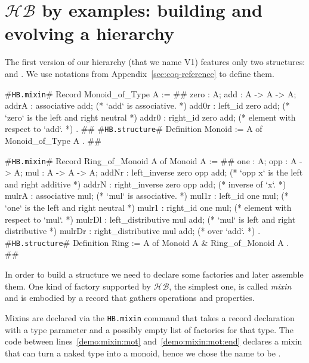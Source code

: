 \documentclass[a4paper,UKenglish,cleveref, autoref]{lipics-v2019}
\newcommand{\HB}{\ensuremath{\mathcal{HB}}}
\newcommand{\mixin}{mixin}
\newcommand{\mixins}{mixins}
\newcommand{\Mixins}{Mixins}
\newcommand{\factory}{factory}
\newcommand{\factories}{factories}
\newcommand{\hbmixin}{{\tt\color{dkgreen}HB.mixin}}
\newcommand{\hbstructure}{{\tt\color{dkgreen}HB.structure}}
\theoremstyle{implem}
\theoremstyle{implem}
\theoremstyle{command}
\theoremstyle{commands}
\begin{document}
\section{\HB{} by examples: building and evolving a hierarchy}
\label{sec:example}

The first version of our hierarchy (that we name V1) features only two
structures:  and . We use notations from Appendix~\ref{sec:coq-reference} to define them.
\begin{coqcode}
#\hbmixin{}# Record Monoid_of_Type A := {                       #\label{demo:mixin:mot}#
  zero : A;
  add : A -> A -> A;
  addrA : associative add;             (* `add` is associative.                   *)
  add0r : left_id zero add;            (* `zero` is the left and right neutral    *)
  addr0 : right_id zero add;           (*   element with respect to `add`.        *)
}.                                                             #\label{demo:mixin:mot:end}#
#\hbstructure{}# Definition Monoid := { A of Monoid_of_Type A }.        #\label{demo:structure:monoid}#

#\hbmixin{}# Record Ring_of_Monoid A of Monoid A := {       #\label{demo:mixin:rom}#
  one : A;
  opp : A -> A;
  mul : A -> A -> A;
  addNr : left_inverse zero opp add;   (* `opp x` is the left and right additive  *)
  addrN : right_inverse zero opp add;  (*   inverse of `x`.                       *)
  mulrA : associative mul;             (* `mul` is associative.                   *)
  mul1r : left_id one mul;             (* `one` is the left and right neutral     *)
  mulr1 : right_id one mul;            (*   element with respect to `mul`.        *)
  mulrDl : left_distributive mul add;  (* `mul` is left and right distributive    *)
  mulrDr : right_distributive mul add; (*   over `add`.                           *)
}.
#\hbstructure{}# Definition Ring := { A of Monoid A & Ring_of_Monoid A }. #\label{demo:structure:ring}#

\end{coqcode}

In order to build a structure we need to declare some \factories{} and
later assemble them. One kind of \factory{} supported by \HB{}, the simplest
one, is called \emph{\mixin{}} and is embodied by a record
that gathers operations and properties.

\Mixins{} are declared via the \hbmixin{} command
that takes a record declaration with
a type parameter and a possibly empty list of \factories{} for that type.
The code between lines~\ref{demo:mixin:mot}
and~\ref{demo:mixin:mot:end} declares a \mixin{} that can turn a naked
type  into a monoid, hence we chose the name to be .
\end{document}
